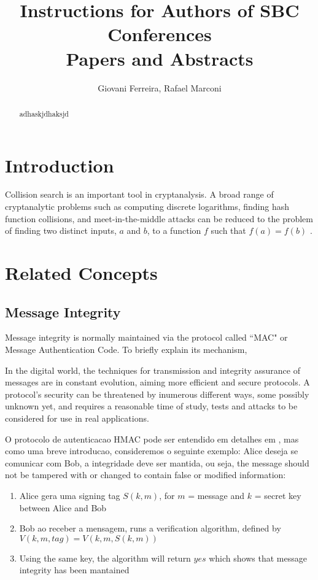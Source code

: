\documentclass[12pt]{article}
\title{Instructions for Authors of SBC Conferences\\ Papers and Abstracts}
\author{Giovani Ferreira\inst{1}, Rafael Marconi\inst{1} }
\begin{document}
\maketitle

\begin{abstract}
adhaskjdhaksjd \cite{tanenbaum2002distributed}
\end{abstract}

\section{Introduction}

Collision search is an important tool in cryptanalysis. A broad range of cryptanalytic problems
such as computing discrete logarithms, finding hash function collisions, and meet-in-the-middle
attacks can be reduced to the problem of finding two distinct inputs, \(a\) and \(b\), to a 
function \(f\) such that \(f(a) = f(b)\) \cite{van1999parallel}.

\section{Related Concepts} 

\subsection{Message Integrity}

Message integrity is normally maintained via the protocol called “MAC" or Message Authentication Code. 
To briefly explain its mechanism,

In the digital world, the techniques for transmission and integrity assurance of messages are in constant
evolution, aiming more efficient and secure protocols. A protocol's security can be threatened by inumerous
different ways, some possibly unknown yet, and requires a reasonable time of study, tests and attacks
to be considered for use in real applications.

O protocolo de autenticacao HMAC pode ser entendido em detalhes em \cite{krawczyk1997hmac}, mas como uma breve
introducao, consideremos o seguinte exemplo: Alice deseja se comunicar com Bob, a integridade deve ser
mantida, ou seja, the message should not be tampered with or changed to contain false or modified information:
\begin{enumerate}
\item Alice gera uma signing tag \(S(k, m)\), for \(m\) = message and \(k\) = secret key between Alice and Bob
\item Bob ao receber a mensagem, runs a verification algorithm, defined by \(V(k, m, tag) = V(k, m, S(k, m))\)
\item Using the same key, the algorithm will return \(yes\) which shows that message integrity has been mantained
\end{enumerate}
\end{document}
